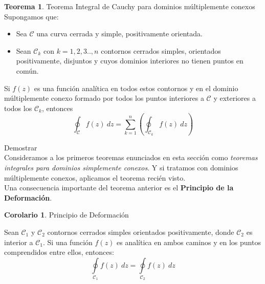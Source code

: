 \documentclass[12pt]{article}
\theoremstyle{definition}
\theoremstyle{theorem}
\newtheorem{theorem}{Teorema}[section]
\theoremstyle{corolary}
\newtheorem{corolary}{Corolario}[section]
\begin{document}
\colorbox{magenta!40!white!80}{\parbox{\linewidth}{
\theoremstyle{theorem}
\begin{theorem} {Teorema Integral de Cauchy para dominios m\'ultiplemente conexos}\\

Supongamos que:
\begin{itemize}
	\item Sea $\mathcal{C}$ una curva cerrada y simple, positivamente orientada.
	\item Sean $\mathcal{C}_k$ con $k=1,2,3.., n$ contornos cerrados simples, orientados positivamente, disjuntos y cuyos dominios interiores no tienen puntos en com\'un.
\end{itemize}

Si $f(z)$ es una funci\'on anal\'itica en todos estos contornos y en el dominio m\'ultiplemente conexo formado por todos los puntos interiores a $\mathcal{C}$ y exteriores a todos los $\mathcal{C}_k$, entonces $$\oint_{\mathcal{C}}f(z)\ dz = \sum\limits_{k=1}^n \left( \oint_{\mathcal{C}_k} f(z)\ dz \right)$$

\end{theorem}}}
\linebreak

Demostrar\\

Consideramos a los primeros teoremas enunciados en esta secci\'on como \textit{teoremas integrales para dominios simplemente conexos}. Y si tratamos con dominios m\'ultiplemente conexos, aplicamos el teorema reci\'en visto.\\

Una consecuencia importante del teorema anterior es el \textbf{Principio de la Deformaci\'on}.\\

\colorbox{pink!40!white!80}{\parbox{\linewidth}{
\theoremstyle{theorem}
\begin{corolary} {Principio de Deformaci\'on}

Sean $\mathcal{C}_1$ y $\mathcal{C}_2$ contornos cerrados simples orientados positivamente, donde $\mathcal{C}_2$ es interior a $\mathcal{C}_1$. Si una funci\'on $f(z)$ es anal\'itica en ambos caminos y en los puntos comprendidos entre ellos, entonces: $$\oint\limits_{\mathcal{C}_1}f(z)\ dz = \oint\limits_{\mathcal{C}_2}f(z)\ dz$$

\end{corolary}}}
\linebreak
\linebreak
\end{document}

